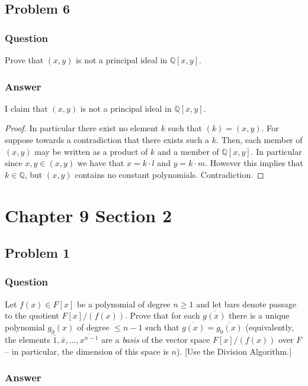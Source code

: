 \documentclass[12pt]{article}
\begin{document}
\subsection{Problem 6}

\subsubsection{Question}
Prove that $(x,y)$ is not a principal ideal in $\mathbb{Q}[x,y]$.
\subsubsection{Answer}
I claim that $(x,y)$ is not a principal ideal in $\mathbb{Q}[x,y]$.
\begin{proof}
In particular there exist no element $k$ such that $(k)=(x,y)$. For suppose towards a contradiction that there exists such a $k$. Then, each member of $(x,y)$ may be written as a product of $k$ and a member of $\mathbb{Q}[x,y]$. In particular since $x,y\in (x,y)$ we have that $x=k \cdot l $ and $y=k \cdot m$. However this implies that $k \in \mathbb{Q}$, but $(x,y)$ contains no constant polynomials. Contradiction.
\end{proof}

\section{Chapter 9 Section 2}
\subsection{Problem 1}

\subsubsection{Question}
Let $f(x) \in F[x]$ be a polynomial of degree $n \geq 1$ and let bars denote passage to the quotient $F[x]/(f(x))$. Prove that for each $\overline{g(x)}$ there is a unique polynomial $g_0(x)$ of degree $\leq n-1$ such that $\overline{g(x)} = \overline{g_0(x)}$ (equivalently, the elements $\overline{1}, \overline{x}, \dots, \overline{x^{n-1}}$ are a \emph{basis}  of the vector space $F[x]/(f(x))$ over $F$ -- in particular, the dimension of this space is $n$). [Use the Division Algorithm.]
\subsubsection{Answer}
\end{document}
